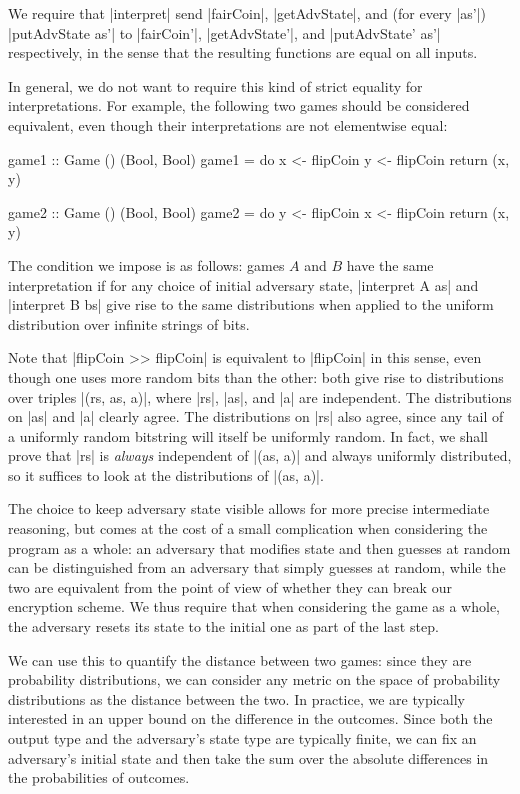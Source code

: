 We require that |interpret| send |fairCoin|, |getAdvState|, and (for every |as'|) |putAdvState as'| to |fairCoin'|,
|getAdvState'|, and |putAdvState' as'| respectively, in the sense that the resulting functions are equal on all inputs.

In general, we do not want to require this kind of strict equality for interpretations.  For example, the following two
games should be considered equivalent, even though their interpretations are not elementwise equal:
\begin{code}
game1 :: Game () (Bool, Bool)
game1 = do
    x <- flipCoin
    y <- flipCoin
    return (x, y)

game2 :: Game () (Bool, Bool)
game2 = do
    y <- flipCoin
    x <- flipCoin
    return (x, y)
\end{code}

The condition we impose is as follows: games $A$ and $B$ have the same interpretation if for any choice of initial
adversary state, |interpret A as| and |interpret B bs| give rise to the same distributions when applied to the uniform
distribution over infinite strings of bits.

Note that |flipCoin >> flipCoin| is equivalent to |flipCoin| in this sense, even though one uses more random bits than
the other: both give rise to distributions over triples |(rs, as, a)|, where |rs|, |as|, and |a| are independent.  The
distributions on |as| and |a| clearly agree.  The distributions on |rs| also agree, since any tail of a uniformly random
bitstring will itself be uniformly random.  In fact, we shall prove that |rs| is \emph{always} independent of |(as, a)|
and always uniformly distributed, so it suffices to look at the distributions of |(as, a)|.

The choice to keep adversary state visible allows for more precise intermediate reasoning, but comes at the cost of a
small complication when considering the program as a whole: an adversary that modifies state and then guesses at random
can be distinguished from an adversary that simply guesses at random, while the two are equivalent from the point of
view of whether they can break our encryption scheme.  We thus require that when considering the game as a whole, the
adversary resets its state to the initial one as part of the last step.

We can use this to quantify the distance between two games: since they are probability distributions, we can consider
any metric on the space of probability distributions as the distance between the two.  In practice, we are typically
interested in an upper bound on the difference in the outcomes.  Since both the output type and the adversary's state
type are typically finite, we can fix an adversary's initial state and then take the sum over the absolute differences
in the probabilities of outcomes.

